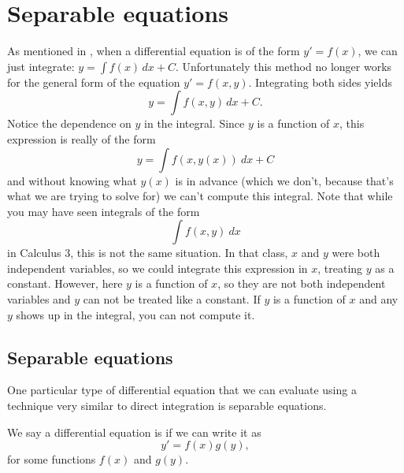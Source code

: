 \section{Separable equations}
\label{separable:section}




As mentioned in , when a differential equation is of the form
$y' = f(x)$,
we can just integrate:
$y = \int f(x) \,dx + C$. 
Unfortunately this method no longer works for the
general form of the equation
$y' = f(x,y)$.
Integrating both sides yields
\begin{equation*}
y = \int f(x,y) \,dx + C .
\end{equation*}
Notice the dependence on $y$ in the integral. Since $y$ is a function of $x$, this expression is really of the form
\begin{equation*}
y = \int f(x, y(x))\ dx + C
\end{equation*}
and without knowing what $y(x)$ is in advance (which we don't, because that's what we are trying to solve for) we can't compute this integral. Note that while you may have seen integrals of the form 
\begin{equation*}
\int f(x,y)\ dx 
\end{equation*} 
in Calculus 3, this is not the same situation. In that class, $x$ and $y$ were both independent variables, so we could integrate this expression in $x$, treating $y$ as a constant. However, here $y$ is a function of $x$, so they are not both independent variables and $y$ can not be treated like a constant. If $y$ is a function of $x$ and any $y$ shows up in the integral, you can not compute it. 

\subsection{Separable equations}

One particular type of differential equation that we can evaluate using a technique very similar to direct integration is separable equations. 
\begin{definition}
We say a differential equation is
\emph{}
if we can write it as
\begin{equation*}
y' = f(x)g(y) ,
\end{equation*}
for some functions $f(x)$ and $g(y)$.
\end{definition}

